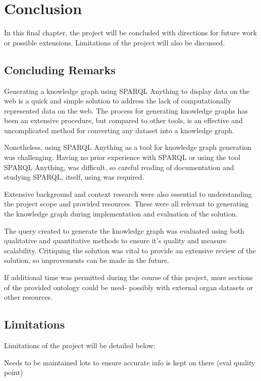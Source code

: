 \chapter{Conclusion}
In this final chapter, the project will be concluded with directions for future work or possible extensions. Limitations of the project will also be discussed. 

\section{Concluding Remarks}
\hspace{0.5cm} Generating a knowledge graph using SPARQL Anything to display data on the web is a quick and simple solution to address the lack of computationally represented data on the web. The process for generating knowledge graphs has been an extensive procedure, but compared to other tools, is an effective and uncomplicated method for converting any dataset into a knowledge graph. 

Nonetheless, using SPARQL Anything as a tool for knowledge graph generation was challenging. Having no prior experience with SPARQL or using the tool SPARQL Anything, was difficult, so careful reading of documentation \cite{sparqlanythinggithub} and studying SPARQL, itself, using \cite{sparlbook} was required. 

Extensive background and context research were also essential to understanding the project scope and provided resources. These were all relevant to generating the knowledge graph during implementation and evaluation of the solution. 

The query created to generate the knowledge graph was evaluated using both qualitative and quantitative methods to ensure it's quality and measure scalability. Critiquing the solution was vital to provide an extensive review of the solution, so improvements can be made in the future. 

If additional time was permitted during the course of this project, more sections of the provided ontology could be used- possibly with external organ datasets or other resources. 

\section{Limitations}
Limitations of the project will be detailed below:

Needs to be maintained lots to ensure accurate info is kept on there (eval quality point)


